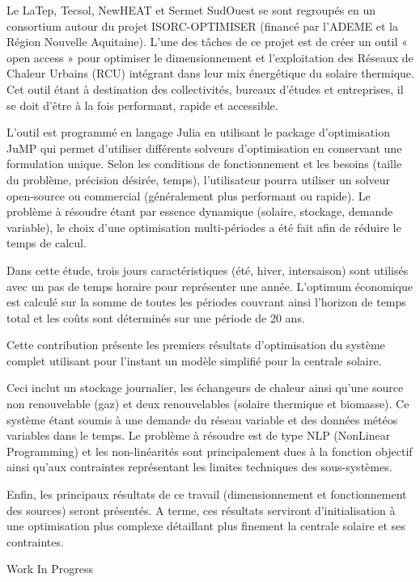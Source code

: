 {\normalsize
Le LaTep, Tecsol, NewHEAT et Sermet SudOuest se sont regroupés en un consortium autour du projet ISORC-OPTIMISER (financé par l'ADEME et la Région Nouvelle Aquitaine).  L'une des tâches de ce projet est de créer un outil « open access » pour optimiser le dimensionnement et l'exploitation des Réseaux de Chaleur Urbains (RCU) intégrant dans leur mix énergétique du solaire thermique. Cet outil étant à destination des collectivités, bureaux d'études et entreprises, il se doit d'être à la fois performant, rapide et accessible.



L'outil est programmé en langage Julia en utilisant le package d'optimisation JuMP qui permet d'utiliser différents solveurs d'optimisation en conservant une formulation unique. Selon les conditions de fonctionnement et les besoins (taille du problème, précision désirée, temps), l'utilisateur pourra utiliser un solveur open-source ou commercial (généralement plus performant ou rapide). Le problème à résoudre étant par essence dynamique (solaire, stockage, demande variable), le choix d'une optimisation multi-périodes a été fait afin de réduire le temps de calcul.



Dans cette étude, trois jours caractéristiques (été, hiver, intersaison) sont utilisés avec un pas de temps horaire pour représenter une année. L'optimum économique est calculé sur la somme de toutes les périodes couvrant ainsi l'horizon de temps total et les coûts sont déterminés sur une période de 20 ans.



Cette contribution présente les premiers résultats d'optimisation du système complet utilisant pour l'instant un modèle simplifié pour la centrale solaire. 



Ceci inclut un stockage journalier, les échangeurs de chaleur ainsi qu'une source non renouvelable (gaz) et deux renouvelables (solaire thermique et biomasse). Ce système étant soumis à une demande du réseau variable et des données météos variables dans le temps. Le problème à résoudre est de type NLP (NonLinear Programming) et les non-linéarités sont principalement dues à la fonction objectif ainsi qu'aux contraintes représentant les limites techniques des sous-systèmes.



Enfin, les principaux résultats de ce travail (dimensionnement et fonctionnement des sources) seront présentés. A terme, ces résultats serviront d'initialisation à une optimisation plus complexe détaillant plus finement la centrale solaire et ses contraintes.

 \vfill Work In Progress

}
 
